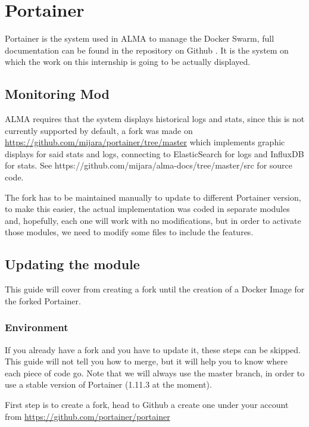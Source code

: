 \chapter{Portainer}

Portainer is the system used in ALMA to manage the Docker Swarm, full documentation can be found in the repository on Github \citep{portainer-github}. It is the system on which the work on this internship is going to be actually displayed. 

\section{Monitoring Mod}

ALMA requires that the system displays historical logs and stats, since this is not currently supported by default, a fork was made on \url{https://github.com/mijara/portainer/tree/master} which implements graphic displays for said stats and logs, connecting to ElasticSearch for logs and InfluxDB for stats. See https://github.com/mijara/alma-docs/tree/master/src for source code.

The fork has to be maintained manually to update to different Portainer version, to make this easier, the actual implementation was coded in separate modules and, hopefully, each one will work with no modifications, but in order to activate those modules, we need to modify some files to include the features.

\section{Updating the module}

This guide will cover from creating a fork until the creation of a Docker Image for the forked Portainer.

\subsection{Environment}

If you already have a fork and you have to update it, these steps can be skipped. This guide will not tell you how to merge, but it will help you to know where each piece of code go. Note that we will always use the master branch, in order to use a stable version of Portainer (1.11.3 at the moment).

First step is to create a fork, head to Github a create one under your account from \url{https://github.com/portainer/portainer}

